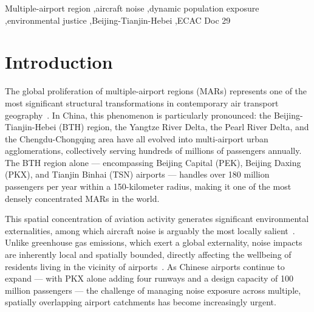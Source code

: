 \documentclass[review,12pt]{elsarticle}
\begin{document}
\begin{frontmatter}
\begin{abstract}
This study makes three key contributions. First, it extends the MAR coordination paradigm --- previously applied only to emissions optimization --- to the domain of noise management. Second, it integrates ADS-B-based high-fidelity noise modeling with big-data-driven dynamic population assessment within a unified framework. Third, it provides actionable evidence for integrated noise governance in one of the world's largest and fastest-growing MARs.
\end{abstract}

\begin{keyword}
Multiple-airport region \sep aircraft noise \sep dynamic population exposure \sep environmental justice \sep Beijing-Tianjin-Hebei \sep ECAC Doc 29
\end{keyword}

\end{frontmatter}

\section{Introduction}
\label{sec:introduction}

The global proliferation of multiple-airport regions (MARs) represents one of the most significant structural transformations in contemporary air transport geography~\citep{xu2025flight}. In China, this phenomenon is particularly pronounced: the Beijing-Tianjin-Hebei (BTH) region, the Yangtze River Delta, the Pearl River Delta, and the Chengdu-Chongqing area have all evolved into multi-airport urban agglomerations, collectively serving hundreds of millions of passengers annually. The BTH region alone --- encompassing Beijing Capital (PEK), Beijing Daxing (PKX), and Tianjin Binhai (TSN) airports --- handles over 180 million passengers per year within a 150-kilometer radius, making it one of the most densely concentrated MARs in the world.

This spatial concentration of aviation activity generates significant environmental externalities, among which aircraft noise is arguably the most locally salient~\citep{heyes2021case, fujiwara2017experience}. Unlike greenhouse gas emissions, which exert a global externality, noise impacts are inherently local and spatially bounded, directly affecting the wellbeing of residents living in the vicinity of airports~\citep{zhu2025dynamic}. As Chinese airports continue to expand --- with PKX alone adding four runways and a design capacity of 100 million passengers --- the challenge of managing noise exposure across multiple, spatially overlapping airport catchments has become increasingly urgent.
\end{document}
